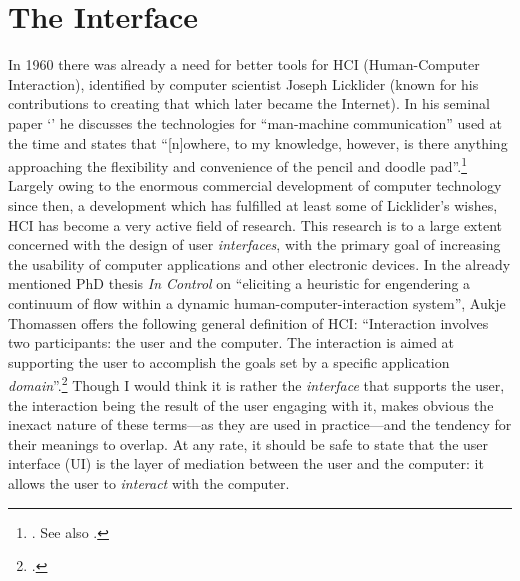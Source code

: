 \section{The Interface}
\label{sec:human-comp-inter}

In 1960 there was already a need for better tools for HCI (Human-Computer Interaction), identified by computer scientist Joseph Licklider (known for his contributions to creating that which later became the Internet). In his seminal paper `' he discusses the technologies for ``man-machine communication'' used at the time and states that ``[n]owhere, to my knowledge, however, is there anything approaching the flexibility and convenience of the pencil and doodle pad''.\footnote{\cite[5.5~\S~2]{licklider60}. See also \cite[3]{pew03}.}
%
%
Largely owing to the enormous commercial development of computer technology since then, a development which has fulfilled at least some of Licklider's wishes, HCI has become a very active field of research. This research is to a large extent concerned with the design of user \emph{interfaces}, with the primary goal of increasing the usability of computer applications and other electronic devices. In the already mentioned PhD thesis \emph{In Control} on ``eliciting a heuristic for engendering a continuum of flow within a dynamic human-computer-interaction system'', Aukje Thomassen offers the following general definition of HCI: ``Interaction involves two participants: the user and the computer. The interaction is aimed at supporting the user to accomplish the goals set by a specific application \textit{domain}''.\footcite[~(author's italics)]{thomassen03} Though I would think it is rather the \emph{interface} that supports the user, the interaction being the result of the user engaging with it, \citeauthor{thomassen03} makes obvious the inexact nature of these terms---as they are used in practice---and the tendency for their meanings to overlap. At any rate, it should be safe to state that the user interface (UI) is the layer of mediation between the user and the computer: it allows the user to \emph{interact} with the computer.

